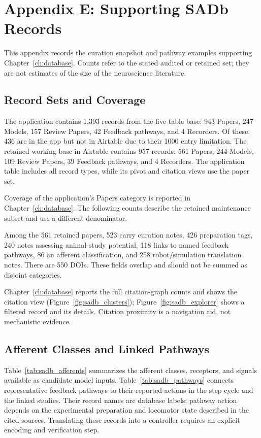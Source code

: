 \chapter{Appendix E: Supporting SADb Records}\label{app:sadb_records}
\graphicspath{{../Figures/96-AppendixE/}{figs/96-AppendixE/}}

This appendix records the curation snapshot and pathway examples supporting Chapter~\ref{ch:database}. Counts refer to the stated audited or retained set; they are not estimates of the size of the neuroscience literature.

\section{Record Sets and Coverage}

The application contains 1,393 records from the five-table base: 943 Papers, 247 Models, 157 Review Papers, 42 Feedback pathways, and 4 Recorders. Of these, 436 are in the app but not in Airtable due to their 1000 entry limitation. The retained working base in Airtable contains 957 records: 561 Papers, 244 Models, 109 Review Papers, 39 Feedback pathways, and 4 Recorders. The application table includes all record types, while its pivot and citation views use the paper set.

Coverage of the application's Papers category is reported in Chapter~\ref{ch:database}. The following counts describe the retained maintenance subset and use a different denominator.

Among the 561 retained papers, 523 carry curation notes, 426 preparation tags, 240 notes assessing animal-study potential, 118 links to named feedback pathways, 86 an afferent classification, and 258 robot/simulation translation notes. There are 550 DOIs. These fields overlap and should not be summed as disjoint categories.

Chapter~\ref{ch:database} reports the full citation-graph counts and shows the citation view (Figure~\ref{fig:sadb_clusters}); Figure~\ref{fig:sadb_explorer} shows a filtered record and its details. Citation proximity is a navigation aid, not mechanistic evidence.



\section{Afferent Classes and Linked Pathways}

Table~\ref{tab:sadb_afferents} summarizes the afferent classes, receptors, and signals available as candidate model inputs. Table~\ref{tab:sadb_pathways} connects representative feedback pathways to their reported actions in the step cycle and the linked studies. Their record names are database labels; pathway action depends on the experimental preparation and locomotor state described in the cited sources. Translating these records into a controller requires an explicit encoding and verification step.

